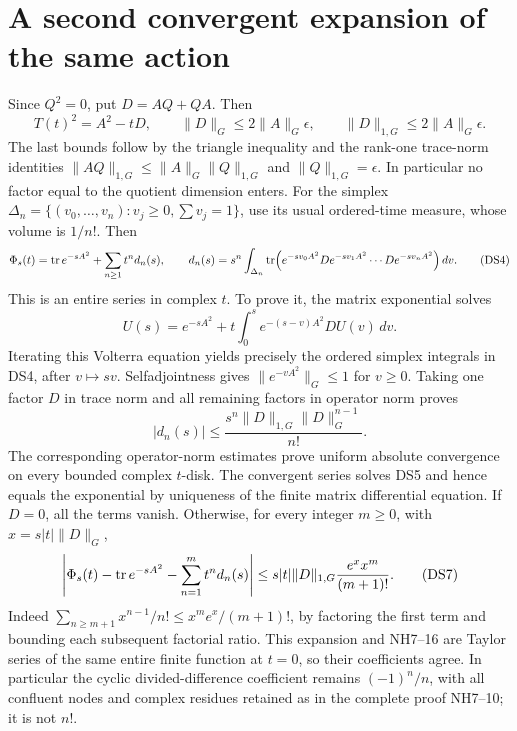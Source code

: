 \section{A second convergent expansion of the same action}
Since \(Q^2=0\), put \(D=AQ+QA\). Then
\[
 T(t)^2=A^2-tD,\qquad
 \|D\|_G\le 2\|A\|_G\epsilon,\qquad
 \|D\|_{1,G}\le 2\|A\|_G\epsilon .
 \tag{DS3}
\]
The last bounds follow by the triangle inequality and the rank-one
trace-norm identities \(\|AQ\|_{1,G}\le\|A\|_G\|Q\|_{1,G}\) and
\(\|Q\|_{1,G}=\epsilon\). In particular no factor equal to the quotient
dimension enters.
For the simplex
\(\Delta_n=\{(v_0,\ldots,v_n):v_j\ge0,\sum v_j=1\}\), use its usual
ordered-time measure, whose volume is \(1/n!\). Then
\[
 \Phi_s(t)=\operatorname{tr} e^{-sA^2}+\sum_{n\ge1}t^n d_n(s),\qquad
 d_n(s)=s^n\int_{\Delta_n}
 \operatorname{tr}\!\left(e^{-sv_0A^2}D e^{-sv_1A^2}\cdots D e^{-sv_nA^2}\right)dv .
 \tag{DS4}
\]
This is an entire series in complex \(t\). To prove it, the matrix
exponential solves
\[
 U(s)=e^{-sA^2}
       +t\int_0^s e^{-(s-v)A^2}D U(v)\,dv.
 \tag{DS5}
\]
Iterating this Volterra equation yields precisely the ordered simplex
integrals in DS4, after \(v\mapsto sv\). Selfadjointness gives
\(\|e^{-vA^2}\|_G\le1\) for \(v\ge0\).
Taking one factor \(D\) in trace norm and all remaining factors in
operator norm proves
\[
 |d_n(s)|\le \frac{s^n\|D\|_{1,G}\|D\|_G^{n-1}}{n!}.
 \tag{DS6}
\]
The corresponding operator-norm estimates prove uniform absolute
convergence on every bounded complex \(t\)-disk. The convergent series
solves DS5 and hence equals the exponential by uniqueness of the finite
matrix differential equation. If \(D=0\), all the terms vanish.
Otherwise, for every integer \(m\ge0\), with \(x=s|t|\|D\|_G\),
\[
 \left|\Phi_s(t)-\operatorname{tr} e^{-sA^2}-\sum_{n=1}^m t^nd_n(s)\right|
 \le s|t|\|D\|_{1,G}\frac{e^x x^m}{(m+1)!}.
 \tag{DS7}
\]
Indeed \(\sum_{n\ge m+1}x^{n-1}/n!
\le x^m e^x/(m+1)!\), by factoring the first term and bounding each
subsequent factorial ratio. This expansion and NH7--16 are Taylor
series of the same entire finite function at \(t=0\), so their
coefficients agree. In particular the cyclic divided-difference
coefficient remains \((-1)^n/n\), with all confluent nodes and complex
residues retained as in the complete proof NH7--10; it is not \(n!\).


